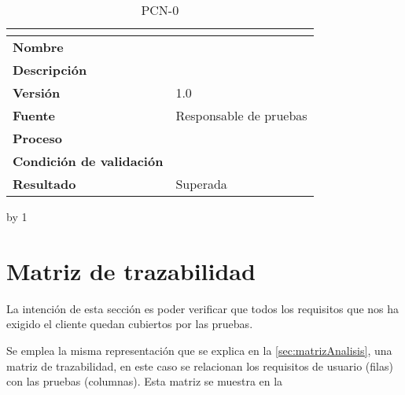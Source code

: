 \newcount\pcn
{}
\begin{table}[H]
	\caption{PCN-0\number\pcn}
	\begin{tabular}{|l|p{}|}
		\hline
		\multicolumn{2}{|c|}{\cellcolor[HTML]{BFBFBF}{\color[HTML]{000000} \textbf{PCN-0\number\pcn}}} \\ \hline
		\textbf{Nombre}                  &   \\ \hline
		\textbf{Descripción}             &   \\ \hline
		\textbf{Versión}                 & 1.0  \\ \hline
		\textbf{Fuente}                  & Responsable de pruebas  \\ \hline
		\textbf{Proceso}                 &   \\ \hline
		\textbf{Condición de validación} &   \\ \hline
		\textbf{Resultado}               & Superada  \\ \hline
	\end{tabular}
\end{table}
\advance\pcn by 1

\section{Matriz de trazabilidad}
La intención de esta sección es poder verificar que todos los requisitos que nos ha exigido el cliente quedan cubiertos por las pruebas. 

Se emplea la misma representación que se explica en la \autoref{sec:matrizAnalisis}, una matriz de trazabilidad, en este caso se relacionan los requisitos de usuario (filas) con las pruebas (columnas). Esta matriz se muestra en la %
